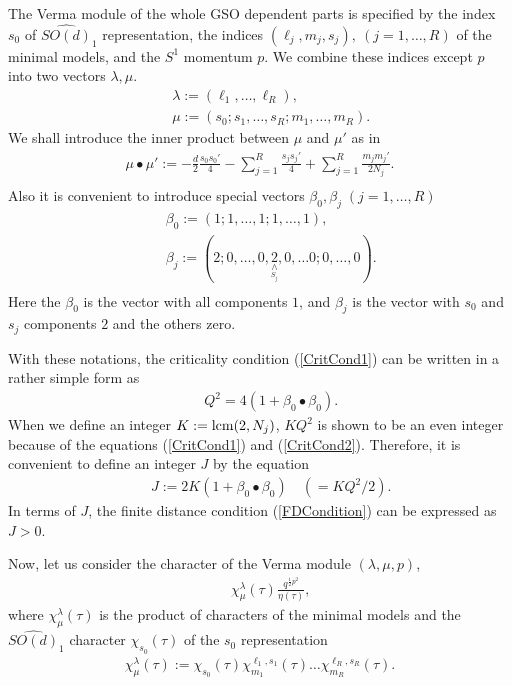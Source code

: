 \documentclass[a4paper,12pt]{article}
\numberwithin{equation}{section}
\newcommand{\lcm}{{\rm lcm}}
\begin{document}
The Verma module of the whole GSO dependent parts is specified by
the index $s_0$ of $\widehat{SO(d)}_{1}$ representation,
the indices $(\ell_j,m_j,s_j),\ (j=1,\dots,R)$ of the minimal models,
and the $S^1$ momentum $p$.
We combine these indices except $p$ into two vectors $\lambda,\mu$.
\begin{eqnarray*}
 && \lambda:=(\ell_1,\dots,\ell_R), \\
 && \mu:=(s_0;s_1,\dots,s_R;m_1,\dots,m_R).
\end{eqnarray*}
We shall introduce the inner product between $\mu$ and $\mu'$
as in \cite{Gep88}
\begin{eqnarray*}
 \mu\bullet\mu':=-\frac d2 \frac{s_0s_0'}{4}-\sum_{j=1}^{R} \frac{s_j s_j'}{4}
+\sum_{j=1}^{R}\frac{m_jm_j'}{2N_j}.\\
\end{eqnarray*}
Also it is convenient to 
introduce special vectors $\beta_0,\beta_j\;(j=1,\dots,R)$
\begin{eqnarray*}
&& \beta_0:=(1;1,\dots,1;1,\dots,1),\\
&& \beta_j:=(2;0,\dots,0,\underset{\underset{S_j}{\wedge}}{2}
,0,\dots0;0,\dots,0).\\
\end{eqnarray*}
Here the $\beta_0$ is the vector with all components $1$, and $\beta_j$ is 
the vector with $s_0$ and $s_j$ components $2$ and the others zero.

With these notations, the criticality condition (\ref{CritCond1}) can 
be written in a rather simple form as 
\begin{eqnarray}
 && Q^2=4(1+\beta_0\bullet\beta_0).  \label{CritCond2}
\end{eqnarray}
When we define an integer $K:=\lcm(2,N_j)$, $KQ^2$ is shown to be
an even integer because of the equations
 (\ref{CritCond1}) and (\ref{CritCond2}). 
Therefore, it is convenient to define an integer $J$ by the equation
\begin{eqnarray}
 && J :=2K(1+\beta_0\bullet\beta_0)\quad(=K Q^2/2).\label{DefJ}
\end{eqnarray}
In terms of $J$, the finite distance condition (\ref{FDCondition}) can
be expressed as $J>0$.

Now, let us consider the character of the Verma module $(\lambda,\mu,p)$,
\begin{eqnarray*}
 && \chi^{\lambda}_{\mu}(\tau) \frac{q^{\frac12 p^2}}{\eta(\tau)},
\end{eqnarray*}
where $\chi^{\lambda}_{\mu}(\tau)$ is the product of
 characters of the minimal models and
the $\widehat{SO(d)}_1$ character $\chi_{s_0}(\tau)$ of the
$s_0$ representation
\begin{eqnarray*}
 \chi^{\lambda}_{\mu}(\tau):=\chi_{s_0}(\tau)\chi_{m_1}^{\ell_1,s_1}(\tau)
\dots\chi_{m_R}^{\ell_R,s_R}(\tau).
\end{eqnarray*}
\end{document}
